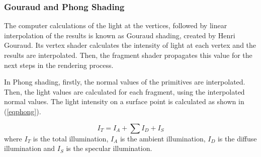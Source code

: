 \documentclass[10pt, conference, compsocconf]{IEEEtran}
\begin{document}
\subsubsection{Gouraud and Phong Shading}
\label{phong}

The computer calculations of the light at the vertices, followed by linear interpolation of the results is known as Gouraud shading, created by Henri Gouraud.
Its vertex shader calculates the intensity of light at each vertex and the results are interpolated. Then, the fragment shader propagates this value for the next steps in the rendering process.

In Phong shading, firstly, the normal values of the primitives are interpolated. Then, the light values are calculated for each fragment, using the interpolated normal values. 
The light intensity on a surface point is calculated as shown in (\ref{eqphong}).

	\begin{equation}
	I_ {T} = I_ {A} +  \sum I_ {D} + I_ {S}
	\label{eqphong}
	\end{equation}
	where $I_{T}$ is the total illumination, $I_A$ is the ambient illumination, $I_D$ is the diffuse illumination and  $I_S$ is the specular illumination. 
\end{document}
